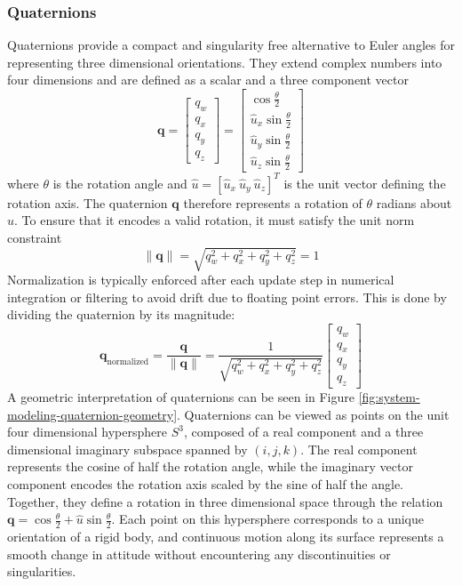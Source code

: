 \newpage



\subsubsection{Quaternions}
Quaternions provide a compact and singularity free alternative to Euler angles for representing three dimensional orientations. They extend complex numbers into four dimensions and are defined as a scalar and a three component vector
$$
    \mathbf{q} =
    \begin{bmatrix}
        q_w \\ q_x \\ q_y \\ q_z
    \end{bmatrix}
    =
    \begin{bmatrix}
        \cos\frac{\theta}{2} \\
        \hat{u}_x \sin\frac{\theta}{2} \\
        \hat{u}_y \sin\frac{\theta}{2} \\
        \hat{u}_z \sin\frac{\theta}{2}
    \end{bmatrix}
$$
where $\theta$ is the rotation angle and $\hat{u} = [\hat{u}_x~\hat{u}_y~\hat{u}_z]^T$ is the unit vector defining the rotation axis. The quaternion $\mathbf{q}$ therefore represents a rotation of $\theta$ radians about $\hat{u}$. To ensure that it encodes a valid rotation, it must satisfy the unit norm constraint
$$
    \|\mathbf{q}\| = \sqrt{q_w^2 + q_x^2 + q_y^2 + q_z^2} = 1
$$
Normalization is typically enforced after each update step in numerical integration or filtering to avoid drift due to floating point errors. This is done by dividing the quaternion by its magnitude:
$$
    \mathbf{q}_{\text{normalized}} = \frac{\mathbf{q}}{\|\mathbf{q}\|} = 
    \frac{1}{\sqrt{q_w^2 + q_x^2 + q_y^2 + q_z^2}}
    \begin{bmatrix}
        q_w \\ q_x \\ q_y \\ q_z
    \end{bmatrix}
$$
A geometric interpretation of quaternions can be seen in Figure \ref{fig:system-modeling-quaternion-geometry}. Quaternions can be viewed as points on the unit four dimensional hypersphere $S^3$, composed of a real component and a three dimensional imaginary subspace spanned by $(i, j, k)$. The real component represents the cosine of half the rotation angle, while the imaginary vector component encodes the rotation axis scaled by the sine of half the angle. Together, they define a rotation in three dimensional space through the relation $\mathbf{q} = \cos\frac{\theta}{2} + \hat{u}\sin\frac{\theta}{2}$. Each point on this hypersphere corresponds to a unique orientation of a rigid body, and continuous motion along its surface represents a smooth change in attitude without encountering any discontinuities or singularities.  
